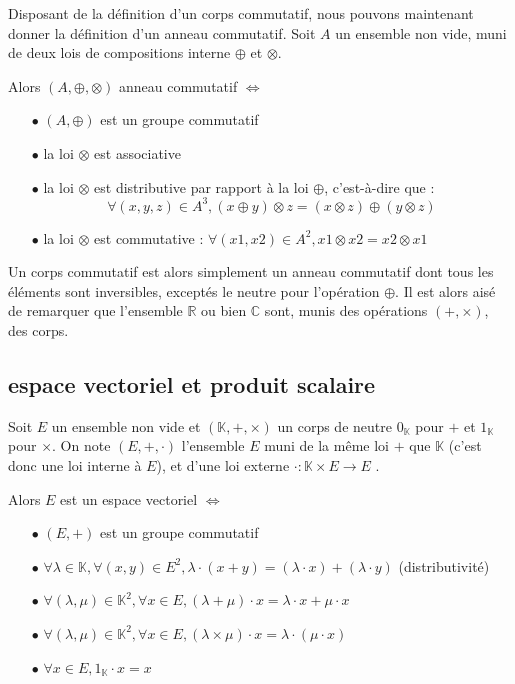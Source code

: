 \documentclass[a4paper,12pt]{report}
\begin{document}
\par{
	Disposant de la définition d'un corps commutatif, nous pouvons maintenant donner la définition d'un anneau commutatif. Soit $A$ un ensemble non vide, muni de deux lois de compositions interne $\oplus$ et $\otimes$.
}

\par{
	Alors $(A, \oplus, \otimes)$ anneau commutatif  $\Leftrightarrow$
}

\begin{itemize}
\item[$\bullet$] $ (A, \oplus)$ est un groupe commutatif
\item[$\bullet$] la loi $\otimes$ est associative
\item[$\bullet$] la loi $\otimes$ est distributive par rapport à la loi $\oplus$, c'est-à-dire que : \[ \forall (x,y,z) \in A^3, (x \oplus y) \otimes z = (x \otimes z) \oplus (y \otimes z) \]
\item[$\bullet$] la loi $\otimes$ est commutative : $\forall (x1,x2) \in A^2, x1 \otimes x2 = x2 \otimes x1$
\end{itemize}

\vspace{1\baselineskip}

\par{
	Un corps commutatif est alors simplement un anneau commutatif dont tous les éléments sont inversibles, exceptés le neutre pour l'opération $\oplus$. Il est alors aisé de remarquer que l'ensemble $\mathbb{R}$ ou bien $\mathbb{C}$ sont, munis des opérations $(+,\times)$, des corps.
}

		\subsection{espace vectoriel et produit scalaire}

\par{
	Soit $E$ un ensemble non vide et $(\mathbb{K},+,\times)$ un corps de neutre $0_{\mathbb{K}}$ pour $+$ et $1_{\mathbb{K}}$ pour $\times$. On note $(E,+,\cdot)$ l'ensemble $E$ muni de la même loi $+$ que $\mathbb{K}$ (c'est donc une loi interne à $E$), et d'une loi externe $\cdot : \mathbb{K} \times E \rightarrow E$ .
}

\par{
	Alors $E$ est un espace vectoriel  $\Leftrightarrow$
}

\begin{itemize}
\item[$\bullet$] $ (E, +)$ est un groupe commutatif
\item[$\bullet$] $\forall \lambda \in \mathbb{K}, \forall (x,y) \in E^2, \lambda \cdot (x+y) = (\lambda \cdot x) + (\lambda \cdot y)$ (distributivité)
\item[$\bullet$] $\forall (\lambda, \mu) \in \mathbb{K}^2, \forall x \in E, (\lambda + \mu) \cdot x = \lambda \cdot x + \mu \cdot x$
\item[$\bullet$] $\forall (\lambda, \mu) \in \mathbb{K}^2, \forall x \in E, (\lambda \times \mu) \cdot x = \lambda \cdot (\mu \cdot x)$
\item[$\bullet$] $\forall x \in E, 1_{\mathbb{K}} \cdot x = x$
\end{itemize}
\end{document}
